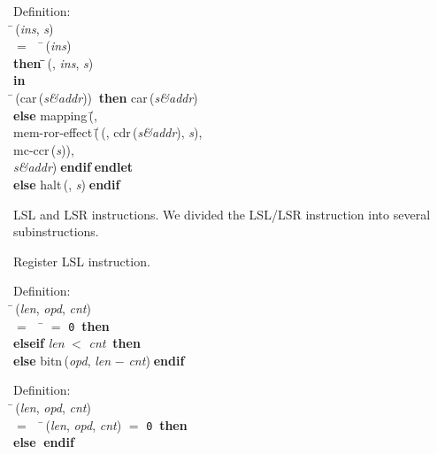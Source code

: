 \begin{tabbing}{\sc Definition}: \\  
\=\,({\it{ins\/}}, {\it{s\/}}) \\ 
$=$$\;\;\;\;$\=\,({\it{ins\/}}) \\ 
{\bf then }\=\=\,({}, {\it{ins\/}}, {\it{s\/}})\- \\ 
{\bf in} \\ 
\=\,({\rm{car}}\,({\it{s\&addr\/}}))$\;\;${\bf then }{\rm{car}}\,({\it{s\&addr\/}}) \\ 
{\bf else }{\rm{mapping}}\,(\=, \\ 
{\rm{mem-ror-effect}}\,(\=\,({}, {\rm{cdr}}\,({\it{s\&addr\/}}), {\it{s\/}}), \\ 
{\rm{mc-ccr}}\,({\it{s\/}}))\-, \\ 
{\it{s\&addr\/}})\-$\;${\bf  endif}\-$\;${\bf  endlet}\- \\ 
{\bf else }{\rm{halt}}\,({}, {\it{s\/}})$\;${\bf  endif}\-\-
\end{tabbing}

 LSL and LSR instructions.
 We divided the LSL/LSR instruction into several subinstructions.

 Register LSL instruction.
\begin{tabbing}{\sc Definition}: \\  
\=\,({\it{len\/}}, {\it{opd\/}}, {\it{cnt\/}}) \\ 
$=$$\;\;\;\;$\= $=$ {\tt{0}}$\;\;${\bf then }{} \\ 
{\bf elseif }{\it{len\/}} $<$ {\it{cnt\/}}$\;\;${\bf then }{} \\ 
{\bf else }{\rm{bitn}}\,({\it{opd\/}}, {\it{len\/}} $-$ {\it{cnt\/}})$\;${\bf  endif}\-\-
\end{tabbing}

\begin{tabbing}{\sc Definition}: \\  
\=\,({\it{len\/}}, {\it{opd\/}}, {\it{cnt\/}}) \\ 
$=$$\;\;\;\;$\=\,({\it{len\/}}, {\it{opd\/}}, {\it{cnt\/}}) $=$ {\tt{0}}$\;\;${\bf then }{} \\ 
{\bf else }{}$\;${\bf  endif}\-\-
\end{tabbing}

